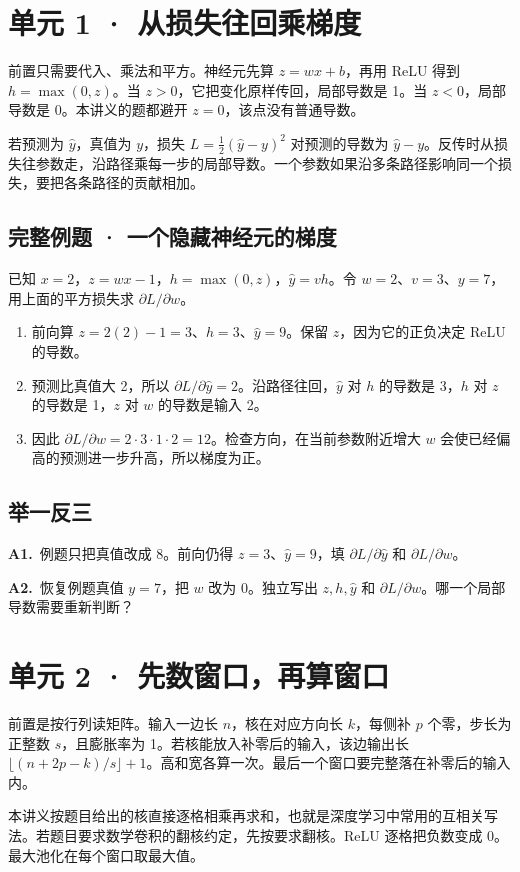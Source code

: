\documentclass[UTF8,a4paper,11pt]{ctexart}
\newcommand{\CompactQuestion}[2]{\par\noindent\textbf{#1.}\ #2\par\vspace{.8em}}
\begin{document}
\clearpage
\section{单元 1 · 从损失往回乘梯度}
前置只需要代入、乘法和平方。神经元先算 $z=wx+b$，再用 ReLU 得到 $h=\max(0,z)$。当 $z>0$，它把变化原样传回，局部导数是 1。当 $z<0$，局部导数是 0。本讲义的题都避开 $z=0$，该点没有普通导数。

若预测为 $\hat y$，真值为 $y$，损失 $L=\frac12(\hat y-y)^2$ 对预测的导数为 $\hat y-y$。反传时从损失往参数走，沿路径乘每一步的局部导数。一个参数如果沿多条路径影响同一个损失，要把各条路径的贡献相加。

\subsection{完整例题 · 一个隐藏神经元的梯度}
已知 $x=2$，$z=wx-1$，$h=\max(0,z)$，$\hat y=vh$。令 $w=2$、$v=3$、$y=7$，用上面的平方损失求 $\partial L/\partial w$。

\begin{enumerate}
\item 前向算 $z=2(2)-1=3$、$h=3$、$\hat y=9$。保留 $z$，因为它的正负决定 ReLU 的导数。
\item 预测比真值大 2，所以 $\partial L/\partial\hat y=2$。沿路径往回，$\hat y$ 对 $h$ 的导数是 3，$h$ 对 $z$ 的导数是 1，$z$ 对 $w$ 的导数是输入 2。
\item 因此 $\partial L/\partial w=2\cdot3\cdot1\cdot2=12$。检查方向，在当前参数附近增大 $w$ 会使已经偏高的预测进一步升高，所以梯度为正。
\end{enumerate}
\subsection{举一反三}
\CompactQuestion{A1}{例题只把真值改成 8。前向仍得 $z=3$、$\hat y=9$，填 $\partial L/\partial\hat y$ 和 $\partial L/\partial w$。}
\CompactQuestion{A2}{恢复例题真值 $y=7$，把 $w$ 改为 0。独立写出 $z,h,\hat y$ 和 $\partial L/\partial w$。哪一个局部导数需要重新判断？}
\clearpage
\section{单元 2 · 先数窗口，再算窗口}
前置是按行列读矩阵。输入一边长 $n$，核在对应方向长 $k$，每侧补 $p$ 个零，步长为正整数 $s$，且膨胀率为 1。若核能放入补零后的输入，该边输出长 $\lfloor(n+2p-k)/s\rfloor+1$。高和宽各算一次。最后一个窗口要完整落在补零后的输入内。

本讲义按题目给出的核直接逐格相乘再求和，也就是深度学习中常用的互相关写法。若题目要求数学卷积的翻核约定，先按要求翻核。ReLU 逐格把负数变成 0。最大池化在每个窗口取最大值。
\end{document}
